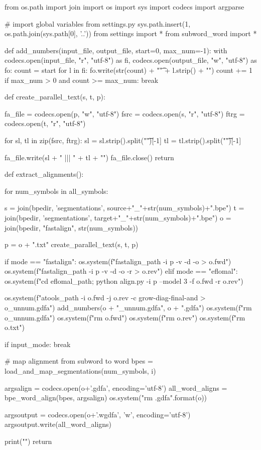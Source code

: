 \begin{python}
from os.path import join
import os
import sys
import codecs
import argparse

# import global variables from settings.py
sys.path.insert(1, os.path.join(sys.path[0], '..'))
from settings import *
from subword_word import *


def add_numbers(input_file, output_file, start=0, max_num=-1):
  with codecs.open(input_file, "r", "utf-8") as fi, codecs.open(output_file, "w", "utf-8") as fo:
    count = start
    for l in fi:
      fo.write(str(count) + "\t" + l.strip() + "\n")
      count += 1
      if max_num > 0 and count >= max_num:
        break

def create_parallel_text(s, t, p):

  fa_file = codecs.open(p, "w", "utf-8")
  fsrc = codecs.open(s, "r", "utf-8")
  ftrg = codecs.open(t, "r", "utf-8")

  for sl, tl in zip(fsrc, ftrg):
    sl = sl.strip().split("\t")[-1]
    tl = tl.strip().split("\t")[-1]

    fa_file.write(sl + " ||| " + tl + "\n")
  fa_file.close()
  return

def extract_alignments():

  for num_symbols in all_symbols:

    s = join(bpedir, 'segmentations', source+"_"+str(num_symbols)+".bpe")
    t = join(bpedir, 'segmentations', target+"_"+str(num_symbols)+".bpe")
    o = join(bpedir, "fastalign", str(num_symbols))

    p = o + ".txt"
    create_parallel_text(s, t, p)

    if mode == "fastalign":
        os.system(f"{fastalign_path} -i {p} -v -d -o > {o}.fwd")
        os.system(f"{fastalign_path} -i {p} -v -d -o -r > {o}.rev")
    elif mode == "eflomal":
        os.system(f"cd {eflomal_path}; python align.py -i {p} --model 3 -f {o}.fwd -r {o}.rev")

    os.system(f"{atools_path} -i {o}.fwd -j {o}.rev -c grow-diag-final-and > {o}_unnum.gdfa")
    add_numbers(o + "_unnum.gdfa", o + ".gdfa")
    os.system(f"rm {o}_unnum.gdfa")
    os.system(f"rm {o}.fwd")
    os.system(f"rm {o}.rev")
    os.system(f"rm {o}.txt")

    if input_mode:
        break

    # map alignment from subword to word
    bpes = load_and_map_segmentations(num_symbols, i)

    argsalign = codecs.open(o+'.gdfa', encoding='utf-8')
    all_word_aligns = bpe_word_align(bpes, argsalign)
    os.system("rm {}.gdfa".format(o))

    argsoutput = codecs.open(o+'.wgdfa', 'w', encoding='utf-8')
    argsoutput.write(all_word_aligns)

    print("\n\n")
  return
\end{python}
